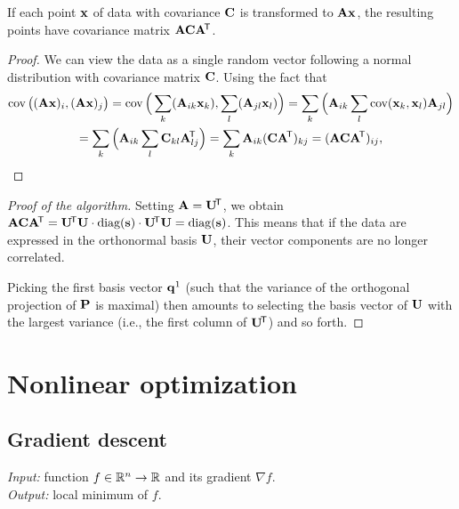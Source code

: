 \begin{lemma}
If each point $\mathbf{x}$ of data with covariance $\mathbf{C}$ is transformed to $\mathbf{A} \mathbf{x}$, the resulting points have covariance matrix $\mathbf{A} \mathbf{C} \mathbf{A} ^{\!\mathsf{T}}$.
\end{lemma}

\begin{proof}
We can view the data as a single random vector following a normal distribution with covariance matrix $\mathbf{C}$.
Using the fact that 
\begin{multline}
\operatorname{\textrm{cov}}\big( (\mathbf{A} \mathbf{x})_i, (\mathbf{A} \mathbf{x})_j \big) = \operatorname{\textrm{cov}}\Big( \sum_k(\mathbf{A}_{ik} \mathbf{x}_k), \sum_l(\mathbf{A}_{jl} \mathbf{x}_l) \Big) = \sum_k \Big( \mathbf{A}_{ik} \sum_l \operatorname{\textrm{cov}}( \mathbf{x}_k, \mathbf{x}_l ) \mathbf{A}_{jl} \Big) \\
= \sum_k \Big( \mathbf{A}_{ik} \sum_l \mathbf{C}_{kl} \mathbf{A}_{lj}^{\!\mathsf{T}} \Big) = \sum_k \mathbf{A}_{ik} (\mathbf{C} \mathbf{A} ^{\!\mathsf{T}})_{kj} = (\mathbf{A} \mathbf{C} \mathbf{A}^{\!\mathsf{T}})_{ij},
\end{multline}
\end{proof}

\begin{proof}[Proof of the algorithm]
Setting $\mathbf{A} = \mathbf{U}^{\!\mathsf{T}}$, we obtain $\mathbf{A} \mathbf{C} \mathbf{A} ^{\!\mathsf{T}} = \mathbf{U}^{\!\mathsf{T}} \mathbf{U} \cdot \textrm{diag}(\mathbf{s}) \cdot \mathbf{U}^{\!\mathsf{T}} \mathbf{U} = \textrm{diag}(\mathbf{s})$.
This means that if the data are expressed in the orthonormal basis  $\mathbf{U}$, their vector components are no longer correlated.

Picking the first basis vector $\mathbf{q}^1$ (such that the variance of the orthogonal projection of $\mathbf{P}$ is maximal) then amounts to selecting the basis vector of $\mathbf{U}$ with the largest variance (i.e., the first column of $\mathbf{U} ^{\!\mathsf{T}}$) and so forth.

\end{proof}

\section{Nonlinear optimization}

\subsection{Gradient descent}
\textit{Input:} function $f \in \mathbb{R}^n \to \mathbb{R}$ and its gradient $\nabla f$.\\
\textit{Output:} local minimum of $f$.\\


